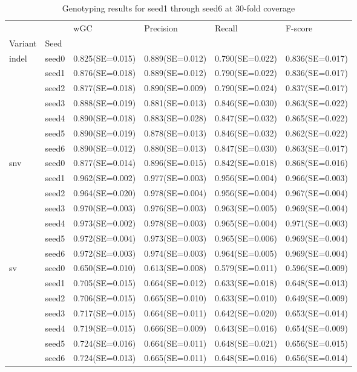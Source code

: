\documentclass[PhD]{PHlab-thesis}
\begin{document}
\begin{table}[ht!]
\begin{tabular*}{\textwidth}{@{\extracolsep{\fill}}llllll@{\extracolsep{\fill}}}
\toprule
   &         &               wGC &         Precision &            Recall &           F-score \\
Variant & Seed &                   &                   &                   &                   \\
\midrule
indel & seed0  & 0.825(SE=0.015) & 0.889(SE=0.012) & 0.790(SE=0.022) & 0.836(SE=0.017) \\
   & seed1 & 0.876(SE=0.018)&  0.889(SE=0.012)&  0.790(SE=0.022)&  0.836(SE=0.017)\\
   & seed2 & 0.877(SE=0.018) & 0.890(SE=0.009) &0.790(SE=0.024) & 0.837(SE=0.017)\\
   & seed3 & 0.888(SE=0.019)& 0.881(SE=0.013)& 0.846(SE=0.030)& 0.863(SE=0.022)\\
   & seed4 & 0.890(SE=0.018) & 0.883(SE=0.028) & 0.847(SE=0.032)&  0.865(SE=0.022)\\
   & seed5 & 0.890(SE=0.019)&  0.878(SE=0.013)&  0.846(SE=0.032)&  0.862(SE=0.022)\\
   & seed6 & 0.890(SE=0.012)&  0.880(SE=0.013)&  0.847(SE=0.030)&  0.863(SE=0.017)\\
\midrule
snv & seed0  & 0.877(SE=0.014)  & 0.896(SE=0.015)  & 0.842(SE=0.018)  & 0.868(SE=0.016) \\
   & seed1 &0.962(SE=0.002)&  0.977(SE=0.003)&  0.956(SE=0.004)&  0.966(SE=0.003)\\
   & seed2 &0.964(SE=0.020)&0.978(SE=0.004)& 0.956(SE=0.004)& 0.967(SE=0.004)\\
   & seed3 & 0.970(SE=0.003)& 0.976(SE=0.003)& 0.963(SE=0.005)& 0.969(SE=0.004)\\
   & seed4 & 0.973(SE=0.002)&  0.978(SE=0.003)&  0.965(SE=0.004)&  0.971(SE=0.003)\\
   & seed5 & 0.972(SE=0.004)&  0.973(SE=0.003)&  0.965(SE=0.006)&  0.969(SE=0.004)\\
   & seed6 &  0.972(SE=0.003)&  0.974(SE=0.003)&  0.964(SE=0.005)&  0.969(SE=0.004) \\
\midrule
sv & seed0  & 0.650(SE=0.010) & 0.613(SE=0.008)  & 0.579(SE=0.011)  & 0.596(SE=0.009) \\
   & seed1 & 0.705(SE=0.015)&  0.664(SE=0.012)&  0.633(SE=0.018)&  0.648(SE=0.013)\\
   & seed2 & 0.706(SE=0.015) & 0.665(SE=0.010) & 0.633(SE=0.010) & 0.649(SE=0.009)\\
   & seed3 & 0.717(SE=0.015)&0.664(SE=0.011)&0.642(SE=0.020)&0.653(SE=0.014)\\
   & seed4 & 0.719(SE=0.015) & 0.666(SE=0.009)&  0.643(SE=0.016)&  0.654(SE=0.009)\\
   & seed5 & 0.724(SE=0.016)&  0.664(SE=0.011)&  0.648(SE=0.021)&  0.656(SE=0.015)\\
   & seed6 & 0.724(SE=0.013)&  0.665(SE=0.011)&  0.648(SE=0.016)&  0.656(SE=0.014)\\
\bottomrule
\end{tabular*}
\caption{Genotyping results for seed1 through seed6 at 30-fold coverage 
\label{table:30x-results}}
\end{table}
\end{document}
